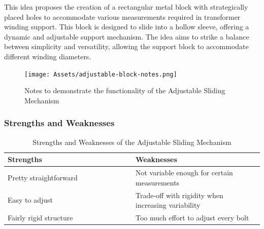 \documentclass[a4paper,10pt]{article}
\begin{document}
This idea proposes the creation of a rectangular metal block with strategically placed holes to accommodate various measurements required in transformer winding support. This block is designed to slide into a hollow sleeve, offering a dynamic and adjustable support mechanism. The idea aims to strike a balance between simplicity and versatility, allowing the support block to accommodate different winding diameters.

\begin{figure}[H]
  \centering
  \texttt{[image: Assets/adjustable-block-notes.png]}
  \caption{Notes to demonstrate the functionality of the Adjustable Sliding Mechanism}
  \label{fig:adjustable-block-notes}
\end{figure}

\subsubsection{Strengths and Weaknesses}

\begin{table}[h]
  \centering
  \begin{tabular}{p{0.5\linewidth} | p{0.5\linewidth}}
    Strengths                                              & Weaknesses \\ \hline
    \textbullet{} Pretty straightforward                   & \textbullet{} Not variable enough for certain measurements \\
    \textbullet{} Easy to adjust                            & \textbullet{} Trade-off with rigidity when increasing variability \\
    \textbullet{} Fairly rigid structure                    & \textbullet{} Too much effort to adjust every bolt \\
  \end{tabular}
  \caption{Strengths and Weaknesses of the Adjustable Sliding Mechanism}
  \label{table:adjustable-block-pros-cons}
\end{table}

\section{}


\pagebreak
\printglossaries
\end{document}
